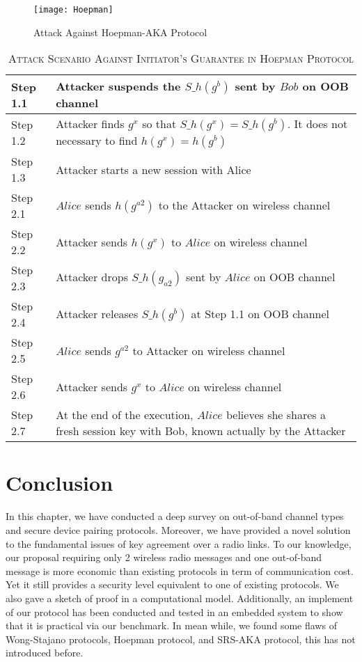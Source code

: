 \begin{figure}
  \centering
  \texttt{[image: Hoepman]}
  \caption{Attack Against Hoepman-AKA Protocol}
  \label{Hoepman}
\end{figure}

\begin{table}[t]
\centering
\caption{\textsc{Attack Scenario Against Initiator's Guarantee in Hoepman Protocol}}
\label{Hoepmantable}
{\small
\begin{tabular}{| l | p{11cm} |}
 \hline
 Step 1.1 & Attacker suspends the $S\_h(g^b)$ sent by $Bob$ on OOB channel\\ \hline
 Step 1.2 & Attacker finds $g^x$ so that $S\_h(g^x) = S\_h(g^b)$. It does not necessary to find $h(g^x) = h(g^b)$  \\ \hline
 Step 1.3 & Attacker starts a new session with Alice\\ \hline \hline
 Step 2.1 & $Alice$ sends $h(g^{a2})$ to the Attacker on wireless channel\\ \hline
 Step 2.2 & Attacker sends $h(g^{x})$ to $Alice$ on wireless channel\\ \hline
 Step 2.3 & Attacker drops $S\_h(g_{a2})$ sent by $Alice$ on OOB channel\\ \hline
 Step 2.4 & Attacker releases $S\_h(g^b)$ at Step 1.1 on OOB channel \\ \hline
 Step 2.5 & $Alice$ sends $g^{a2}$ to Attacker on wireless channel \\ \hline
 Step 2.6 & Attacker sends $g^{x}$ to $Alice$ on wireless channel\\ \hline
 Step 2.7 & At the end of the execution, $Alice$ believes she shares a fresh session key with Bob, known actually by the Attacker\\ \hline
\end{tabular}
}
\end{table}

\section{Conclusion}

In this chapter, we have conducted a deep survey on out-of-band channel types and secure device pairing protocols. Moreover, we have provided a novel solution to the fundamental issues of key agreement over a radio links. To our knowledge, our proposal requiring only 2 wireless radio messages and one out-of-band message is more economic than existing protocols in term of communication cost. Yet it still provides a security level equivalent to one of existing protocols. We also gave a sketch of proof in a computational model. Additionally, an implement of our protocol has been conducted and tested in an embedded system to show that it is practical via our benchmark. In mean while, we found some flaws of Wong-Stajano protocols, Hoepman protocol, and SRS-AKA protocol, this has not introduced before. 




